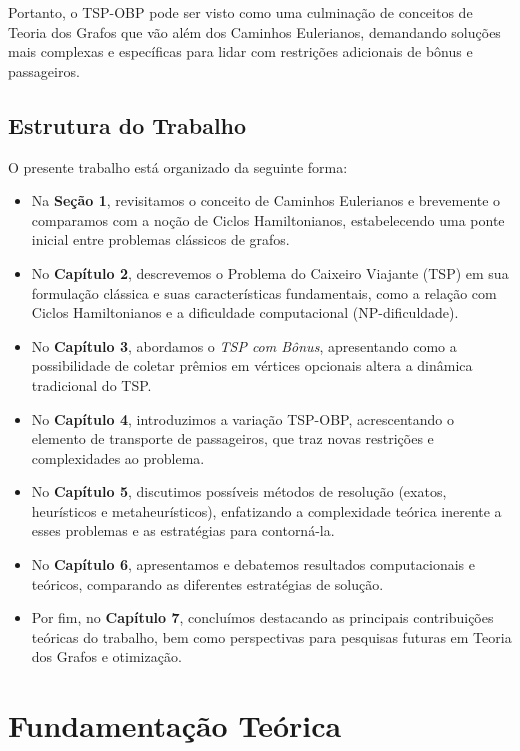 \documentclass[12pt, a4paper]{report}
\begin{document}
Portanto, o TSP-OBP pode ser visto como uma culminação de conceitos de Teoria dos Grafos que vão além dos Caminhos Eulerianos, demandando soluções mais complexas e específicas para lidar com restrições adicionais de bônus e passageiros.

\section*{Estrutura do Trabalho}
O presente trabalho está organizado da seguinte forma:

\begin{itemize}
    \item Na \textbf{Seção 1}, revisitamos o conceito de Caminhos Eulerianos e brevemente o comparamos com a noção de Ciclos Hamiltonianos, estabelecendo uma ponte inicial entre problemas clássicos de grafos.
    \item No \textbf{Capítulo 2}, descrevemos o Problema do Caixeiro Viajante (TSP) em sua formulação clássica e suas características fundamentais, como a relação com Ciclos Hamiltonianos e a dificuldade computacional (NP-dificuldade).
    \item No \textbf{Capítulo 3}, abordamos o \textit{TSP com Bônus}, apresentando como a possibilidade de coletar prêmios em vértices opcionais altera a dinâmica tradicional do TSP.
    \item No \textbf{Capítulo 4}, introduzimos a variação TSP-OBP, acrescentando o elemento de transporte de passageiros, que traz novas restrições e complexidades ao problema.
    \item No \textbf{Capítulo 5}, discutimos possíveis métodos de resolução (exatos, heurísticos e metaheurísticos), enfatizando a complexidade teórica inerente a esses problemas e as estratégias para contorná-la.
    \item No \textbf{Capítulo 6}, apresentamos e debatemos resultados computacionais e teóricos, comparando as diferentes estratégias de solução.
    \item Por fim, no \textbf{Capítulo 7}, concluímos destacando as principais contribuições teóricas do trabalho, bem como perspectivas para pesquisas futuras em Teoria dos Grafos e otimização.
\end{itemize}

\chapter{Fundamentação Teórica}
\end{document}
